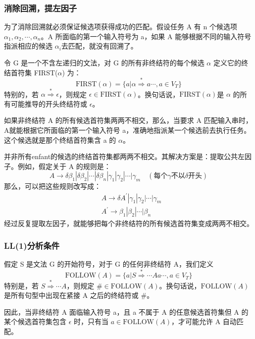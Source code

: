 \subsubsection{消除回溯，提左因子}

为了消除回溯就必须保证候选项获得成功的匹配。假设任务 A 有 n 个候选项 $\alpha_1,\alpha_2,\cdots,\alpha_n$。A 所面临的第一个输入符号为 a，如果 A 能够根据不同的输入符号指派相应的候选 $\alpha_i$去匹配，就没有回溯了。

令 G 是一个不含左递归的文法，对 G 的所有非终结符的每个候选 $\alpha$ 定义它的终结首符集 FIRST($\alpha$) 为：
\[\text{FIRST}(\alpha) = \{ a | \alpha \stackrel{*}{\Rightarrow} a \cdots, a \in V_{T} \}\]
特别的，若 $\alpha \stackrel{*}{\Rightarrow} \epsilon$，则规定 $\epsilon \in \text{FIRST}(\alpha)$。换句话说，$\text{FIRST}(\alpha)$是 $\alpha$ 的所有可能推导的开头终结符或 $\epsilon$。

如果非终结符 A 的所有候选首符集两两不相交，那么，当要求 A 匹配输入串时，A就能根据它所面临的第一个输入符号 a，准确地指派某一个候选前去执行任务。这个候选就是那个终结首符集含 a 的 $\alpha$。

并非所有enfant的候选的终结首符集都两两不相交。其解决方案是：提取公共左因子。例如，假定关于 A 的规则是：
\[ A \rightarrow \delta \beta_1 | \delta \beta_2 | \cdots | \delta \beta_n | \gamma_1 | \gamma_2 | \cdots | \gamma_m \quad (\text{每个} \gamma \text{不以} \delta \text{开头}) \]
那么，可以把这些规则改写成：
\begin{equation}
    \begin{aligned}
         & A \rightarrow \delta A^{'} | \gamma_1 | \gamma_2 | \cdots | \gamma_m \\
         & A^{'} \rightarrow \beta_1 | \beta_2 | \cdots | \beta_n \nonumber
    \end{aligned}
\end{equation}
经过反复提取左因子，就能够把每个非终结符的所有候选首符集变成两两不相交。

\subsubsection{LL(1)分析条件}

假定 S 是文法 G 的开始符号，对于 G 的任何非终结符 A，我们定义
\[ \text{FOLLOW}(A) = \{ a|S\stackrel{*}{\Rightarrow} \cdots Aa \cdots, a\in V_T \} \]
特别是，若 $S\stackrel{*}{\Rightarrow} \cdots A$，则规定 $\# \in \text{FOLLOW}(A)$。换句话说，$\text{FOLLOW}(A)$ 是所有句型中出现在紧接 A 之后的终结符或 \#。

因此，当非终结符 A 面临输入符号 a，且 a 不属于 A 的任意候选首符集但 A 的某个候选首符集包含 $\epsilon$ 时，只有当 $a \in \text{FOLLOW}(A)$，才可能允许 A 自动匹配。

